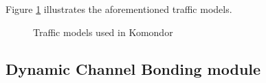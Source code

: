 \documentclass[a4paper]{article}
\begin{document}
Figure \ref{fig:traffic_models} illustrates the aforementioned traffic models. 
\begin{figure}[h!]
	\centering
	\caption{Traffic models used in Komondor}
	\label{fig:traffic_models}
\end{figure}	

\subsection{Dynamic Channel Bonding module}

\end{document}
